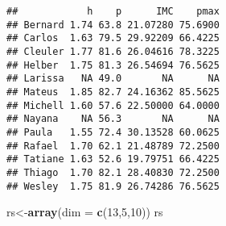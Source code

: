\documentclass[]{article}
\newenvironment{Shaded}{\begin{snugshade}}{\end{snugshade}}
\newcommand{\KeywordTok}[1]{\textcolor[rgb]{0.13,0.29,0.53}{\textbf{#1}}}
\newcommand{\DataTypeTok}[1]{\textcolor[rgb]{0.13,0.29,0.53}{#1}}
\newcommand{\DecValTok}[1]{\textcolor[rgb]{0.00,0.00,0.81}{#1}}
\newcommand{\NormalTok}[1]{#1}
\begin{document}
\begin{verbatim}
##            h    p      IMC    pmax
## Bernard 1.74 63.8 21.07280 75.6900
## Carlos  1.63 79.5 29.92209 66.4225
## Cleuler 1.77 81.6 26.04616 78.3225
## Helber  1.75 81.3 26.54694 76.5625
## Larissa   NA 49.0       NA      NA
## Mateus  1.85 82.7 24.16362 85.5625
## Michell 1.60 57.6 22.50000 64.0000
## Nayana    NA 56.3       NA      NA
## Paula   1.55 72.4 30.13528 60.0625
## Rafael  1.70 62.1 21.48789 72.2500
## Tatiane 1.63 52.6 19.79751 66.4225
## Thiago  1.70 82.1 28.40830 72.2500
## Wesley  1.75 81.9 26.74286 76.5625
\end{verbatim}

\begin{Shaded}
\begin{Highlighting}[]
\NormalTok{rs<-}\KeywordTok{array}\NormalTok{(}\DataTypeTok{dim =} \KeywordTok{c}\NormalTok{(}\DecValTok{13}\NormalTok{,}\DecValTok{5}\NormalTok{,}\DecValTok{10}\NormalTok{))}
\NormalTok{rs}
\end{Highlighting}
\end{Shaded}
\end{document}

